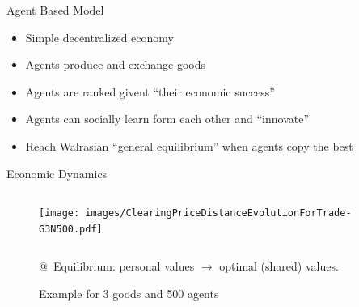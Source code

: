 \documentclass[12pt, notes=show]{beamer}
\begin{document}
\begin{frame}{Agent Based Model}
    
    \begin{itemize}
	\item<+-> Simple decentralized economy
	\item<+-> Agents produce and exchange goods
	\item<+-> Agents are ranked givent ``their economic success''
	\item<+-> Agents can socially learn form each other and ``innovate''
	\item<+-> Reach Walrasian ``general equilibrium'' when agents copy the best 
    \end{itemize}
\end{frame}


\begin{frame}{Economic Dynamics}
	\begin{figure}
	    \caption{Example for 3 goods and 500 agents}
	    \begin{columns}
		\texttt{[image: images/ClearingPriceDistanceEvolutionForTrade-G3N500.pdf]}\\
	    \end{columns}
		@~Equilibrium: personal values  $\rightarrow$ optimal (shared) values.
	\end{figure}
	
\end{frame}
\end{document}
